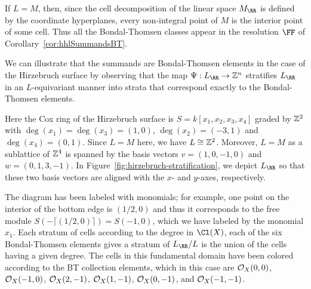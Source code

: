 \documentclass{amsart}
\begin{document}
\begin{example}
If $L=M$, then, since the cell decomposition of the linear space $M_{\RR}$ is defined by the coordinate
hyperplanes, every non-integral point of $M$ is the interior point of some cell. Thus all  the Bondal-Thomsen classes appear in the resolution $\FF$ of Corollary~\ref{cor:hhlSummandsBT}.

\label{ex:resHirzebruch3} 
  We can illustrate that the summands are Bondal-Thomsen elements in the case of the Hirzebruch surface by observing that the map $\Psi:L_{\RR} \rightarrow \ZZ^n$ stratifies $L_{\RR}$ in an $L$-equivariant manner into strata that correspond exactly to the Bondal-Thomsen elements.

  Here the Cox ring of the Hirzebruch surface is $S=k[x_1,x_2,x_3,x_4]$ graded by $\mathbb Z^2$ with $\deg(x_1)=\deg(x_3) = (1,0)$, $\deg(x_2)=(-3,1)$ and $\deg(x_4)=(0,1)$. Since $L=M$ here, we have $L\cong \mathbb Z^2$. Moreover, $L=M$ as a sublattice of $\mathbb Z^4$ is spanned by the basis vectors $v=(1,0,-1,0)$ and $w=(0,1,3,-1)$. In Figure~\ref{fig:hirzebruch-stratification}, we depict $L_{\RR}$ so that these two basis vectors are aligned with the $x$- and $y$-axes, respectively.
\end{example}
  
The diagram has been labeled with monomials; for example, one point on the interior of the bottom edge is $(1/2,0)$ and thus it corresponds to the free module $S(-\lceil(1/2,0)\rceil) = S(-1,0)$, which we have labeled by the monomial $x_1$. Each stratum of  cells according to the degree in $\Cl(X)$, each of the six Bondal-Thomsen elements gives a stratum of $L_{\RR}/L$ is the union of
the cells having a given degree.
The cells in this fundamental domain have been colored according to the BT collection elements, which in this case are ${\mathcal O}_{X}(0,0)$, ${\mathcal O}_{X}(-1,0)$, ${\mathcal O}_{X}(2,-1)$, ${\mathcal O}_{X}(1,-1)$, ${\mathcal O}_{X}(0,-1)$, and ${\mathcal O}_{X}(-1,-1)$.
\end{document}
